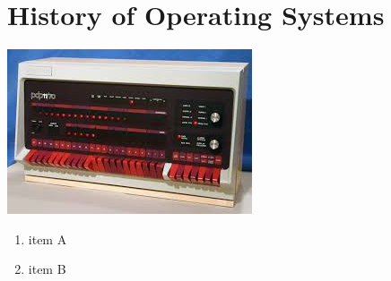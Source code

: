 \section{History of Operating Systems}

\includegraphics[]{pdp11.jpg}
\begin{enumerate}
    \item item A
    \item item B
\end{enumerate}